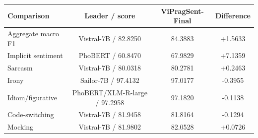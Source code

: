 \small
\setlength{\tabcolsep}{4pt}
\begin{tabular}{lccc}
\toprule
Comparison & Leader / score & ViPragSent-Final & Difference \\
\midrule
Aggregate macro F1 & Vistral-7B / 82.8250 & 84.3883 & +1.5633 \\
Implicit sentiment & PhoBERT / 60.8470 & 67.9829 & +7.1359 \\
Sarcasm & Vistral-7B / 80.0318 & 80.2781 & +0.2463 \\
Irony & Sailor-7B / 97.4132 & 97.0177 & -0.3955 \\
Idiom/figurative & PhoBERT/XLM-R-large / 97.2958 & 97.1820 & -0.1138 \\
Code-switching & Vistral-7B / 81.9458 & 81.8164 & -0.1294 \\
Mocking & Vistral-7B / 81.9802 & 82.0528 & +0.0726 \\
\bottomrule
\end{tabular}%
